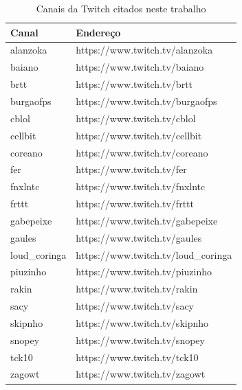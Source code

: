 \documentclass{eic-bcc-tcc}
\begin{document}
\begin{table}[h!]
\centering
\small
\begin{tabular}{ll}
\hline
\textbf{Canal} & \textbf{Endereço} \\ \hline
alanzoka      & https://www.twitch.tv/alanzoka \\
baiano        & https://www.twitch.tv/baiano \\
brtt          & https://www.twitch.tv/brtt \\
burgaofps     & https://www.twitch.tv/burgaofps \\
cblol         & https://www.twitch.tv/cblol \\
cellbit       & https://www.twitch.tv/cellbit \\
coreano       & https://www.twitch.tv/coreano \\
fer           & https://www.twitch.tv/fer \\
fnxlntc       & https://www.twitch.tv/fnxlntc \\
frttt         & https://www.twitch.tv/frttt \\
gabepeixe     & https://www.twitch.tv/gabepeixe \\
gaules        & https://www.twitch.tv/gaules \\
loud\_coringa & https://www.twitch.tv/loud\_coringa \\
piuzinho      & https://www.twitch.tv/piuzinho \\
rakin         & https://www.twitch.tv/rakin \\
sacy          & https://www.twitch.tv/sacy \\
skipnho       & https://www.twitch.tv/skipnho \\
snopey        & https://www.twitch.tv/snopey \\
tck10         & https://www.twitch.tv/tck10 \\
zagowt        & https://www.twitch.tv/zagowt \\ \hline
\end{tabular}
\caption{Canais da Twitch citados neste trabalho}
\label{tab:apendice-canais}
\end{table}

\end{document}
